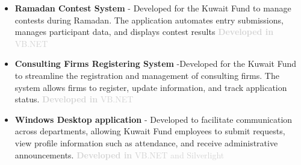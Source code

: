 \documentclass[11pt]{article}
\begin{document}
\begin{itemize}
                 \vspace{0.8em} %
                \item      \label{sec: Kfund-Ramadan} \textbf{Ramadan Contest System} - Developed for the Kuwait Fund to manage contests during Ramadan. The application automates entry submissions, manages participant data, and displays contest results {\textcolor{lightgray} { \textbf{Developed in}  VB.NET }} 
                 \label{sec: Kfund-ConsultingFirms} 
                 \vspace{0.8em} %
                \item \textbf{Consulting Firms Registering System} -Developed for the Kuwait Fund to streamline the registration and management of consulting firms. The system allows firms to register, update information, and track application status.
                {\textcolor{lightgray} { \textbf{Developed in}  VB.NET }}
                \vspace{0.8em} %
                \item \label{sec: Kfund-desktop} \textbf{Windows Desktop application}  - Developed to facilitate communication across departments, allowing Kuwait Fund employees to submit requests, view profile information such as attendance, and receive administrative announcements. 
                 {\textcolor{lightgray} { \textbf{Developed in}  VB.NET and Silverlight}} 
                 

\end{itemize}
\end{document}
